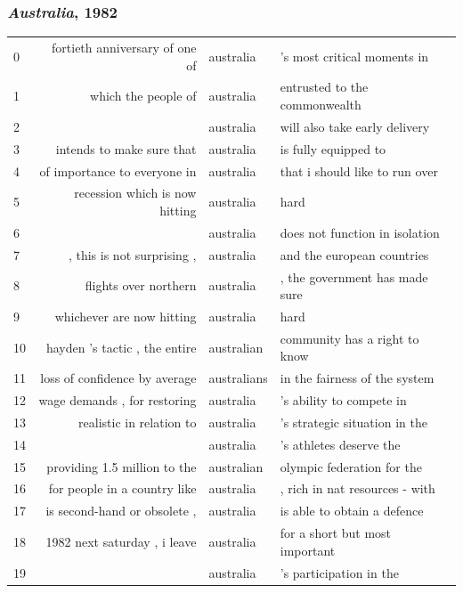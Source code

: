 \documentclass{beamer}       %
\begin{document}
\begin{frame}
\frametitle{\emph{Australia}, 1982}
\begin{table}
\tiny
\begin{tabular}{lrll}
   0 &   fortieth anniversary of one of & australia   & 's most critical moments in \\
   1 &              which the people of & australia   & entrusted to the commonwealth \\
   2 &                                  & australia   & will also take early delivery \\
   3 &        intends to make sure that & australia   & is fully equipped to \\
   4 &     of importance to everyone in & australia   & that i should like to run over \\
   5 &   recession which is now hitting & australia   & hard \\
   6 &                                  & australia   & does not function in isolation \\
   7 &       , this is not surprising , & australia   & and the european countries \\
   8 &            flights over northern & australia   & , the government has made sure \\
   9 &        whichever are now hitting & australia   & hard \\
  10 &    hayden 's tactic , the entire & australian  & community has a right to know \\
  11 &    loss of confidence by average & australians & in the fairness of the system \\
  12 &     wage demands , for restoring & australia   & 's ability to compete in \\
  13 &         realistic in relation to & australia   & 's strategic situation in the \\
  14 &                                  & australia   & 's athletes deserve the \\
  15 &   providing 1.5 million to the  & australian   & olympic federation for the \\
  16 &     for people in a country like & australia   & , rich in nat resources - with \\
  17 &     is second-hand or obsolete , & australia   & is able to obtain a defence \\
  18 &     1982 next saturday , i leave & australia   & for a short but most important \\
  19 &                                  & australia   & 's participation in the \\
\end{tabular}
\end{table}
\end{frame}
\end{document}
